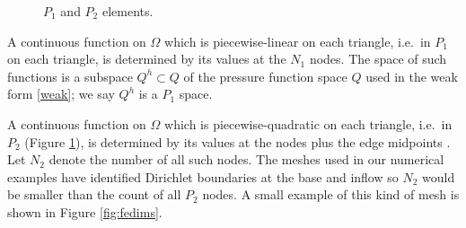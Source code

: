 \documentclass[letterpaper,final,12pt,reqno]{amsart}
\begin{document}
\begin{figure}[ht]
\caption{$P_1$ and $P_2$ elements.}
\label{fig:fedofs}
\end{figure}

A continuous function on $\Omega$ which is piecewise-linear on each triangle, i.e.~in $P_1$ on each triangle, is determined by its values at the $N_1$ nodes.  The space of such functions is a subspace $Q^h \subset Q$ of the pressure function space $Q$ used in the weak form \eqref{weak}; we say $Q^h$ is a $P_1$ space.

A continuous function on $\Omega$ which is piecewise-quadratic on each triangle, i.e.~in $P_2$ (Figure \ref{fig:fedofs}), is determined by its values at the nodes plus the edge midpoints \cite{Elmanetal2014}.  Let $N_2$ denote the number of all such nodes.  The meshes used in our numerical examples have identified Dirichlet boundaries at the base and inflow so $N_2$ would be smaller than the count of all $P_2$ nodes.  A small example of this kind of mesh is shown in Figure \ref{fig:fedims}.
\end{document}
